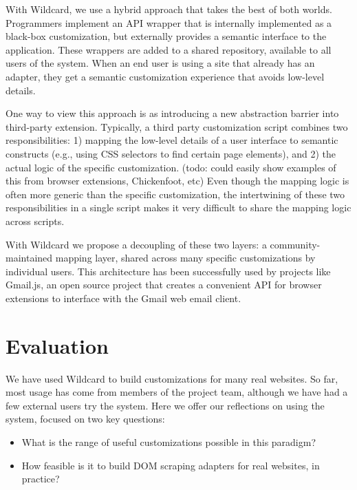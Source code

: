 \documentclass[sigplan,10pt,anonymous,review]{acmart}
\providecommand{\tightlist}{%
  \setlength{\itemsep}{0pt}\setlength{\parskip}{0pt}}
\begin{document}
With Wildcard, we use a hybrid approach that takes the best of both
worlds. Programmers implement an API wrapper that is internally
implemented as a black-box customization, but externally provides a
semantic interface to the application. These wrappers are added to a
shared repository, available to all users of the system. When an end
user is using a site that already has an adapter, they get a semantic
customization experience that avoids low-level details.

One way to view this approach is as introducing a new abstraction
barrier into third-party extension. Typically, a third party
customization script combines two responsibilities: 1) mapping the
low-level details of a user interface to semantic constructs (e.g.,
using CSS selectors to find certain page elements), and 2) the actual
logic of the specific customization. (todo: could easily show examples
of this from browser extensions, Chickenfoot, etc) Even though the
mapping logic is often more generic than the specific customization, the
intertwining of these two responsibilities in a single script makes it
very difficult to share the mapping logic across scripts.

With Wildcard we propose a decoupling of these two layers: a
community-maintained mapping layer, shared across many specific
customizations by individual users. This architecture has been
successfully used by projects like Gmail.js, an open source project that
creates a convenient API for browser extensions to interface with the
Gmail web email client.

\hypertarget{sec:evaluation}{%
\section{Evaluation}\label{sec:evaluation}}

We have used Wildcard to build customizations for many real websites. So
far, most usage has come from members of the project team, although we
have had a few external users try the system. Here we offer our
reflections on using the system, focused on two key questions:

\begin{itemize}
\tightlist
\item
  What is the range of useful customizations possible in this paradigm?
\item
  How feasible is it to build DOM scraping adapters for real websites,
  in practice?
\end{itemize}
\end{document}
